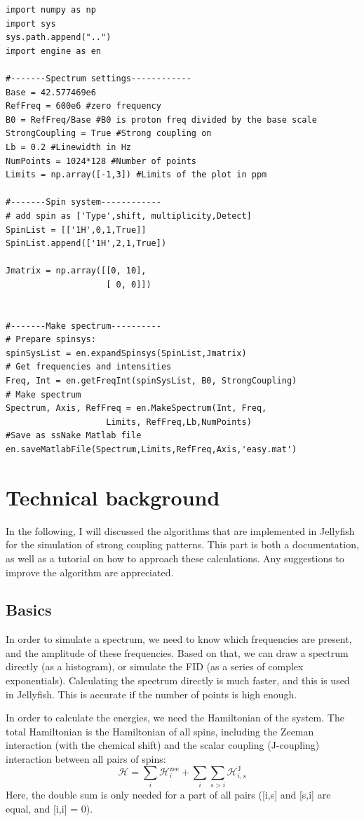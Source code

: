\documentclass[11pt,a4paper]{article}
\begin{document}
\lstset{language=python} 
\begin{lstlisting}[frame=single]  
import numpy as np
import sys
sys.path.append("..")
import engine as en

#-------Spectrum settings------------
Base = 42.577469e6
RefFreq = 600e6 #zero frequency
B0 = RefFreq/Base #B0 is proton freq divided by the base scale
StrongCoupling = True #Strong coupling on
Lb = 0.2 #Linewidth in Hz
NumPoints = 1024*128 #Number of points
Limits = np.array([-1,3]) #Limits of the plot in ppm

#-------Spin system------------
# add spin as ['Type',shift, multiplicity,Detect]
SpinList = [['1H',0,1,True]] 
SpinList.append(['1H',2,1,True])

Jmatrix = np.array([[0, 10],
                    [ 0, 0]])


#-------Make spectrum----------
# Prepare spinsys:
spinSysList = en.expandSpinsys(SpinList,Jmatrix) 
# Get frequencies and intensities
Freq, Int = en.getFreqInt(spinSysList, B0, StrongCoupling) 
# Make spectrum
Spectrum, Axis, RefFreq = en.MakeSpectrum(Int, Freq, 
					Limits, RefFreq,Lb,NumPoints) 
#Save as ssNake Matlab file
en.saveMatlabFile(Spectrum,Limits,RefFreq,Axis,'easy.mat')
\end{lstlisting}

\section{Technical background}
In the following, I will discussed the algorithms that are implemented in Jellyfish for
the simulation of strong coupling patterns. This part is both a documentation, as well as
a tutorial on how to approach these calculations. Any suggestions to improve the algorithm
are appreciated.

\subsection{Basics}
In order to simulate a spectrum, we need to know which frequencies are present, and the
amplitude of these frequencies. Based on that, we can draw a spectrum directly (as a
histogram), or simulate the FID (as a series of complex exponentials). Calculating the
spectrum directly is much faster, and this is used in Jellyfish. This is accurate if the
number of points is high enough.

In order to calculate the energies, we need the Hamiltonian of the system. The total
Hamiltonian is the Hamiltonian of all spins, including the Zeeman interaction (with the
chemical shift) and the scalar coupling (J-coupling) interaction between all pairs of
spins:
\begin{equation}
  \mathcal{H} = \sum_{i}{\mathcal{H}_{i}^\text{zee}} + \sum_{i}\sum_{s>i}{\mathcal{H}_{i,s}^\text{J}}
\end{equation}
Here, the double sum is only needed for a part of all pairs ([i,s] and [s,i] are equal,
and [i,i] = 0).
\end{document}
